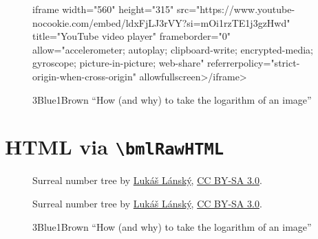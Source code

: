 \documentclass{article}
\begin{document}
\begin{figure}
  \centering
  \<iframe width="560" height="315" src="https://www.youtube-nocookie.com/embed/ldxFjLJ3rVY?si=mOi1rzTE1j3gzHwd" title="YouTube video player" frameborder="0" allow="accelerometer; autoplay; clipboard-write; encrypted-media; gyroscope; picture-in-picture; web-share" referrerpolicy="strict-origin-when-cross-origin" allowfullscreen>\</iframe>
  \caption{3Blue1Brown ``How (and why) to take the logarithm of an image''}
\end{figure}

\section{HTML via \texttt{\textbackslash bmlRawHTML}}
\begin{figure}
  \centering
  \caption{Surreal number tree by \href{https://commons.wikimedia.org/wiki/User:Luk\%C3\%A1\%C5\%A1_L\%C3\%A1nsk\%C3\%BD}{Lukáš Lánský}, \href{https://creativecommons.org/licenses/by-sa/3.0}{CC BY-SA 3.0}.}
\end{figure}

\begin{figure}
  \centering
  \caption{Surreal number tree by \href{https://commons.wikimedia.org/wiki/User:Luk\%C3\%A1\%C5\%A1_L\%C3\%A1nsk\%C3\%BD}{Lukáš Lánský}, \href{https://creativecommons.org/licenses/by-sa/3.0}{CC BY-SA 3.0}.}
\end{figure}

\begin{figure}
  \centering
  \caption{3Blue1Brown ``How (and why) to take the logarithm of an image''}
\end{figure}
\end{document}

